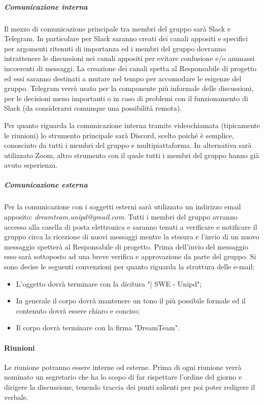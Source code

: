 \subparagraph{Comunicazione interna}
Il mezzo di comunicazione principale tra membri del gruppo sarà Slack e Telegram.
In particolare per Slack saranno creati dei canali appositi e specifici per argomenti ritenuti di importanza ed i membri del gruppo dovranno intrattenere le discussioni nei canali appositi per evitare confusione e/o ammassi incoerenti di messaggi. La creazione dei canali spetta al Responsabile di progetto ed essi saranno destinati a mutare nel tempo per accomodare le esigenze del gruppo.
Telegram verrà usato per la componente più informale delle discussioni, per le decisioni meno importanti o in caso di problemi con il funzionamento di Slack (da considerarsi comunque una possibilità remota). 

Per quanto riguarda la comunicazione interna tramite videochiamata (tipicamente le riunioni) lo strumento principale sarà Discord, scelto poiché è semplice, conosciuto da tutti i membri del gruppo e multipiattaforma. In alternativa sarà utilizzato Zoom, altro strumento con il quale tutti i membri del gruppo hanno già avuto esperienza.

\subparagraph{Comunicazione esterna}
 Per la comunicazione con i soggetti esterni sarà utilizzato un indirizzo email apposito: \textit{dreamteam.unipd@gmail.com}.
Tutti i membri del gruppo avranno accesso alla casella di posta elettronica e saranno tenuti a verificare e notificare il gruppo circa la ricezione di nuovi messaggi mentre la stesura e l'invio di un nuovo messaggio spetterà al Responsabile di progetto.
Prima dell'invio del messaggio esso sarà sottoposto ad una breve verifica e approvazione da parte del gruppo.
Si sono decise le seguenti convenzioni per quanto riguarda la struttura delle e-mail:
\begin{itemize}
\item L'oggetto dovrà terminare con la dicitura "| SWE - Unipd";
\item In generale il corpo dovrà mantenere un tono il più possibile formale ed il contenuto dovrà essere chiaro e conciso;
\item Il corpo dovrà terminare con la firma "DreamTeam".
\end{itemize}

\paragraph{Riunioni}
Le riunione potranno essere interne od esterne. Prima di ogni riunione verrà nominato un segretario che ha lo scopo di far rispettare l'ordine del giorno e dirigere la discussione, tenendo traccia dei punti salienti per poi poter redigere il verbale.

